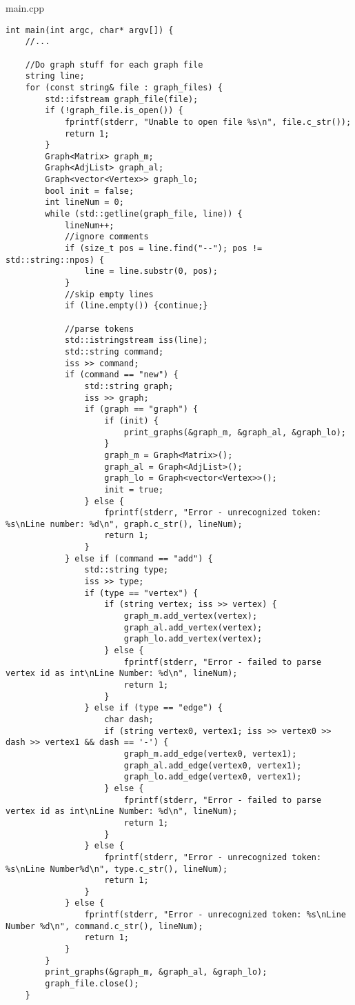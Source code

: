 \documentclass[letterpaper, 10pt,DIV=13]{scrartcl}
\numberwithin{equation}{section} %
\numberwithin{figure}{section} %
\numberwithin{table}{section} %
\begin{document}
main.cpp
\begin{verbatim}
int main(int argc, char* argv[]) {
    //...

    //Do graph stuff for each graph file
    string line;
    for (const string& file : graph_files) {
        std::ifstream graph_file(file);
        if (!graph_file.is_open()) {
            fprintf(stderr, "Unable to open file %s\n", file.c_str());
            return 1;
        }
        Graph<Matrix> graph_m;
        Graph<AdjList> graph_al;
        Graph<vector<Vertex>> graph_lo;
        bool init = false;
        int lineNum = 0;
        while (std::getline(graph_file, line)) {
            lineNum++;
            //ignore comments
            if (size_t pos = line.find("--"); pos != std::string::npos) {
                line = line.substr(0, pos);
            }
            //skip empty lines
            if (line.empty()) {continue;}

            //parse tokens
            std::istringstream iss(line);
            std::string command;
            iss >> command;
            if (command == "new") {
                std::string graph;
                iss >> graph;
                if (graph == "graph") {
                    if (init) {
                        print_graphs(&graph_m, &graph_al, &graph_lo);
                    }
                    graph_m = Graph<Matrix>();
                    graph_al = Graph<AdjList>();
                    graph_lo = Graph<vector<Vertex>>();
                    init = true;
                } else {
                    fprintf(stderr, "Error - unrecognized token: %s\nLine number: %d\n", graph.c_str(), lineNum);
                    return 1;
                }
            } else if (command == "add") {
                std::string type;
                iss >> type;
                if (type == "vertex") {
                    if (string vertex; iss >> vertex) {
                        graph_m.add_vertex(vertex);
                        graph_al.add_vertex(vertex);
                        graph_lo.add_vertex(vertex);
                    } else {
                        fprintf(stderr, "Error - failed to parse vertex id as int\nLine Number: %d\n", lineNum);
                        return 1;
                    }
                } else if (type == "edge") {
                    char dash;
                    if (string vertex0, vertex1; iss >> vertex0 >> dash >> vertex1 && dash == '-') {
                        graph_m.add_edge(vertex0, vertex1);
                        graph_al.add_edge(vertex0, vertex1);
                        graph_lo.add_edge(vertex0, vertex1);
                    } else {
                        fprintf(stderr, "Error - failed to parse vertex id as int\nLine Number: %d\n", lineNum);
                        return 1;
                    }
                } else {
                    fprintf(stderr, "Error - unrecognized token: %s\nLine Number%d\n", type.c_str(), lineNum);
                    return 1;
                }
            } else {
                fprintf(stderr, "Error - unrecognized token: %s\nLine Number %d\n", command.c_str(), lineNum);
                return 1;
            }
        }
        print_graphs(&graph_m, &graph_al, &graph_lo);
        graph_file.close();
    }


\end{verbatim}
\end{document}
